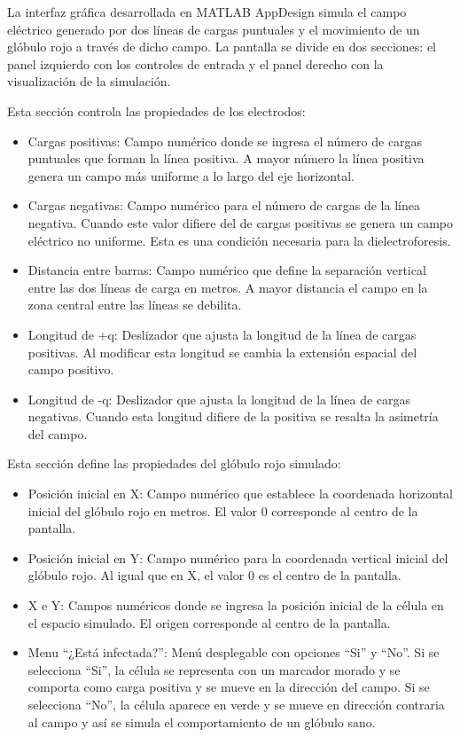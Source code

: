 
\tab La interfaz gráfica desarrollada en MATLAB AppDesign simula el campo eléctrico generado por dos líneas de cargas puntuales y el movimiento de un glóbulo rojo a través de dicho campo. La pantalla se divide en dos secciones: el panel izquierdo con los controles de entrada y el panel derecho con la visualización de la simulación.

Esta sección controla las propiedades de los electrodos:
\begin{itemize}
    \item Cargas positivas: Campo numérico donde se ingresa el número de cargas puntuales que forman la línea positiva. A mayor número la línea positiva genera un campo más uniforme a lo largo del eje horizontal.
    \item Cargas negativas: Campo numérico para el número de cargas de la línea negativa. Cuando este valor difiere del de cargas positivas se genera un campo eléctrico no uniforme. Esta es una condición necesaria para la dielectroforesis.
    \item Distancia entre barras: Campo numérico que define la separación vertical entre las dos líneas de carga en metros. A mayor distancia el campo en la zona central entre las líneas se debilita.
    \item Longitud de +q: Deslizador que ajusta la longitud de la línea de cargas positivas. Al modificar esta longitud se cambia la extensión espacial del campo positivo. 
    \item Longitud de -q: Deslizador que ajusta la longitud de la línea de cargas negativas. Cuando esta longitud difiere de la positiva se resalta la asimetría del campo.
\end{itemize}

\tab Esta sección define las propiedades del glóbulo rojo simulado:
\begin{itemize}
    \item Posición inicial en X: Campo numérico que establece la coordenada horizontal inicial del glóbulo rojo en metros. El valor 0 corresponde al centro de la pantalla.
    \item Posición inicial en Y: Campo numérico para la coordenada vertical inicial del glóbulo rojo. Al igual que en X, el valor 0 es el centro de la pantalla.
    \item X e Y: Campos numéricos donde se ingresa la posición inicial de la célula en el espacio simulado. El origen corresponde al centro de la pantalla.
    \item Menu “¿Está infectada?”: Menú desplegable con opciones “Si” y “No”. Si se selecciona “Si”, la célula se representa con un marcador morado y se comporta como carga positiva y se mueve en la dirección del campo. Si se selecciona “No”, la célula aparece en verde y se mueve en dirección contraria al campo y así se simula el comportamiento de un glóbulo sano.
\end{itemize}

